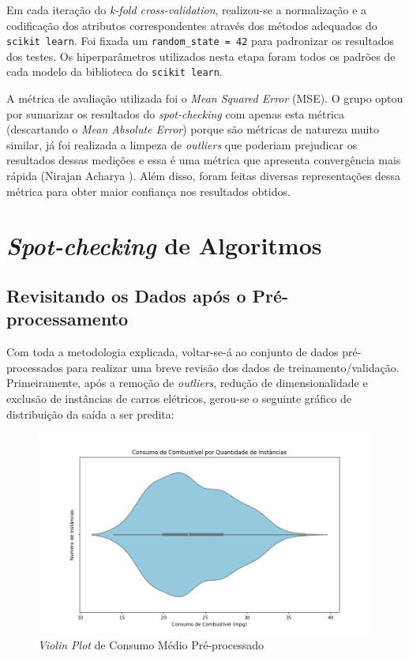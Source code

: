 \documentclass{report}
\let\oldsection\section
\renewcommand\section{\clearpage\oldsection}
\begin{document}
Em cada iteração do \textit{k-fold cross-validation}, realizou-se a normalização e a codificação dos atributos correspondentes através dos métodos adequados do \texttt{scikit learn}. Foi fixada um \texttt{random\_state = 42}
para padronizar os resultados dos testes. Os hiperparâmetros utilizados nesta etapa foram todos os padrões de cada modelo da biblioteca do \texttt{scikit learn}.

A métrica de avaliação utilizada foi o \textit{Mean Squared Error} (MSE). O grupo optou por sumarizar os resultados do \textit{spot-checking} com apenas esta métrica (descartando o \textit{Mean Absolute Error}) porque são métricas
de natureza muito similar, já foi realizada a limpeza de \textit{outliers} que poderiam prejudicar os resultados dessas medições e essa é uma métrica que apresenta convergência mais rápida (Nirajan Acharya \cite{MSEAndMAE}). Além
disso, foram feitas diversas representações dessa métrica para obter maior confiança nos resultados obtidos.

\section{\textit{Spot-checking} de Algoritmos} \label{sec:spot_checking}

\subsection{Revisitando os Dados após o Pré-processamento}
\label{subsec:revisit_pre}

Com toda a metodologia explicada, voltar-se-á ao conjunto de dados pré-processados para realizar uma breve revisão dos dados de treinamento/validação. Primeiramente, após a remoção de \textit{outliers}, redução de dimensionalidade
e exclusão de instâncias de carros elétricos, gerou-se o seguinte gráfico de distribuição da saída a ser predita:

\begin{figure}[h!]
  \centering
  \includegraphics[width=.85\linewidth]{images/plots/violin_plots/no_outliers_combination_mpg.png}
  \caption{\label{img:pre_combination_dist} \textit{Violin Plot} de Consumo Médio Pré-processado}
\end{figure}
\end{document}
